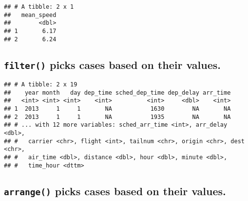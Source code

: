 \documentclass[]{article}
\newenvironment{Shaded}{\begin{snugshade}}{\end{snugshade}}
\newcommand{\DecValTok}[1]{\textcolor[rgb]{0.00,0.00,0.81}{#1}}
\newcommand{\KeywordTok}[1]{\textcolor[rgb]{0.13,0.29,0.53}{\textbf{#1}}}
\newcommand{\NormalTok}[1]{#1}
\newcommand{\OperatorTok}[1]{\textcolor[rgb]{0.81,0.36,0.00}{\textbf{#1}}}
\newcommand{\StringTok}[1]{\textcolor[rgb]{0.31,0.60,0.02}{#1}}
\begin{document}
\begin{verbatim}
## # A tibble: 2 x 1
##   mean_speed
##        <dbl>
## 1       6.17
## 2       6.24
\end{verbatim}

\hypertarget{filter-picks-cases-based-on-their-values.}{%
\subsection{\texorpdfstring{\texttt{filter()} picks cases based on their
values.}{filter() picks cases based on their values.}}\label{filter-picks-cases-based-on-their-values.}}

\begin{Shaded}
\end{Shaded}

\begin{verbatim}
## # A tibble: 2 x 19
##    year month   day dep_time sched_dep_time dep_delay arr_time
##   <int> <int> <int>    <int>          <int>     <dbl>    <int>
## 1  2013     1     1       NA           1630        NA       NA
## 2  2013     1     1       NA           1935        NA       NA
## # ... with 12 more variables: sched_arr_time <int>, arr_delay <dbl>,
## #   carrier <chr>, flight <int>, tailnum <chr>, origin <chr>, dest <chr>,
## #   air_time <dbl>, distance <dbl>, hour <dbl>, minute <dbl>,
## #   time_hour <dttm>
\end{verbatim}

\hypertarget{arrange-picks-cases-based-on-their-values.}{%
\subsection{\texorpdfstring{\texttt{arrange()} picks cases based on
their
values.}{arrange() picks cases based on their values.}}\label{arrange-picks-cases-based-on-their-values.}}

\begin{Shaded}
\end{Shaded}
\end{document}
